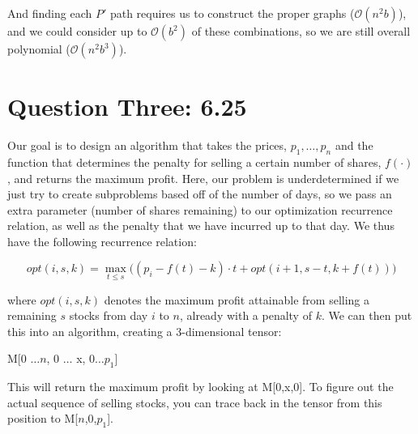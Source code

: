 \documentclass[11pt,letterpaper]{article}
\begin{document}
And finding each $P'$ path requires us to construct the proper graphs ($\mathcal{O}(n^2b)$), and we could consider up to $\mathcal{O}(b^2)$ of these combinations, so we are still overall polynomial ($\mathcal{O}(n^2b^3)$). 


\section*{Question Three: 6.25}
Our goal is to design an algorithm that takes the prices, $p_1,\ldots,p_n$ and the function that determines the penalty for selling a certain number of shares, $f(\cdot)$, and returns the maximum profit. Here, our problem is underdetermined if we just try to create subproblems based off of the number of days, so we pass an extra parameter (number of shares remaining) to our optimization recurrence relation, as well as the penalty that we have incurred up to that day. We thus have the following recurrence relation:

$$ opt(i,s,k) = \max_{t\leq s} \Big( (p_i - f(t) - k)\cdot t + opt(i+1, s-t, k+f(t)) \Big) $$

where $opt(i,s,k)$ denotes the maximum profit attainable from selling a remaining $s$ stocks from day $i$ to $n$, already with a penalty of $k$. We can then put this into an algorithm, creating a 3-dimensional tensor:

\begin{algorithm}[H]
	M[0 $\ldots n$, 0 $\ldots$ x, 0$\ldots p_1$]\;
\end{algorithm}

This will return the maximum profit by looking at M[0,x,0]. To figure out the actual sequence of selling stocks, you can trace back in the tensor from this position to M[$n$,0,$p_1$].
\end{document}
